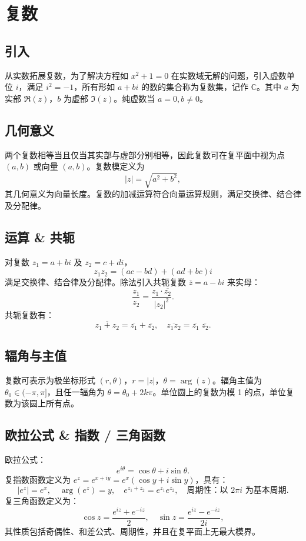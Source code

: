 \documentclass[12pt, a4paper, oneside]{ctexbook}
\begin{document}
\section{复数}

\subsection*{引入}
从实数拓展复数，为了解决方程如 $x^2+1=0$ 在实数域无解的问题，引入虚数单位 $i$，满足 $i^2 = -1$，所有形如 $a + bi$ 的数的集合称为复数集，记作 $\mathbb{C}$。其中 $a$ 为实部 $\Re(z)$，$b$ 为虚部 $\Im(z)$。纯虚数当 $a=0, b\neq0$。

\subsection*{几何意义}
两个复数相等当且仅当其实部与虚部分别相等，因此复数可在复平面中视为点 $(a,b)$ 或向量 $(a,b)$。复数模定义为
\[
|z| = \sqrt{a^2 + b^2},
\]
其几何意义为向量长度。复数的加减运算符合向量运算规则，满足交换律、结合律及分配律。

\subsection*{运算 \& 共轭}
对复数 $z_1 = a+bi$ 及 $z_2 = c+di$，
\[
z_1 z_2 = (ac - bd) + (ad + bc)i
\]
满足交换律、结合律及分配律。除法引入共轭复数 $\overline{z} = a - bi$ 来实母：
\[
\frac{z_1}{z_2} = \frac{z_1 \cdot \overline{z_2}}{|z_2|^2}.
\]
共轭复数有：
\[
\overline{z_1 + z_2} = \overline{z_1} + \overline{z_2},\quad
\overline{z_1 z_2} = \overline{z_1}\;\overline{z_2}.
\]

\subsection*{辐角与主值}
复数可表示为极坐标形式 $(r, \theta)$，$r = |z|$，$\theta = \arg(z)$。辐角主值为 $\theta_0 \in (-\pi, \pi]$，且任一辐角为 $\theta = \theta_0 + 2k\pi$。单位圆上的复数为模 1 的点，单位复数为该圆上所有点。

\subsection*{欧拉公式 \& 指数 / 三角函数}
欧拉公式：
\[
e^{i\theta} = \cos\theta + i\sin\theta.
\]
复指数函数定义为 $e^z = e^{x+iy} = e^x(\cos y + i\sin y)$，具有：
\[
|e^z| = e^x,\quad \arg(e^z) = y,\quad e^{z_1+z_2}=e^{z_1}e^{z_2},\quad \text{周期性：以 }2\pi i\text{ 为基本周期}.
\]
复三角函数定义为：
\[
\cos z = \frac{e^{iz} + e^{-iz}}{2},\quad \sin z = \frac{e^{iz} - e^{-iz}}{2i},
\]
其性质包括奇偶性、和差公式、周期性，并且在复平面上无最大模界。
\end{document}
